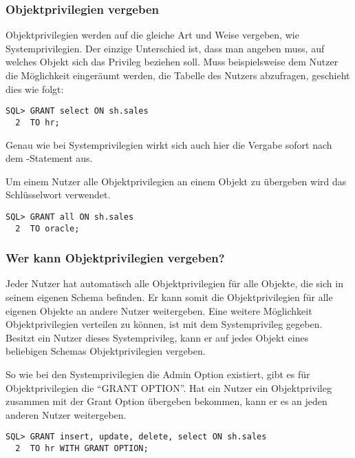         \subsubsection{Objektprivilegien vergeben}
          Objektprivilegien werden auf die gleiche Art und Weise vergeben, wie Systemprivilegien. Der einzige Unterschied ist, dass man angeben muss, auf welches Objekt sich das Privileg beziehen soll. Muss beispielsweise dem Nutzer  die Möglichkeit eingeräumt werden, die Tabelle  des Nutzers  abzufragen, geschieht dies wie folgt:
          \begin{lstlisting}[caption={Zuweisen eines Objekt
          Privilegs},label=admin235,language=oracle_sql] 
SQL> GRANT select ON sh.sales
  2  TO hr;
          \end{lstlisting}
          \begin{merke}
            Genau wie bei Systemprivilegien wirkt sich auch hier die Vergabe sofort nach dem -Statement aus.
          \end{merke}
          Um einem Nutzer alle Objektprivilegien an einem Objekt zu übergeben wird das Schlüs\-selwort  verwendet.
          \begin{lstlisting}[caption={Zuweisen aller
          Objektprivilegien},label=admin236,language=oracle_sql]
SQL> GRANT all ON sh.sales
  2  TO oracle;
          \end{lstlisting}
        \subsubsection{Wer kann Objektprivilegien vergeben?}
          Jeder Nutzer hat automatisch alle Objektprivilegien für alle Objekte, die sich in seinem eigenen Schema befinden. Er kann somit die Objektprivilegien für alle eigenen Objekte an andere Nutzer weitergeben. Eine weitere Möglichkeit Objektprivilegien verteilen zu können, ist mit dem Systemprivileg  gegeben. Besitzt ein Nutzer dieses Systemprivileg, kann er auf jedes Objekt eines beliebigen Schemas Objektprivilegien vergeben.

          So wie bei den Systemprivilegien die Admin Option existiert, gibt es
          für Objektprivilegien die \enquote{GRANT OPTION}. Hat ein Nutzer ein
          Objektprivileg zusammen mit der Grant Option übergeben bekommen,
          kann er es an jeden anderen Nutzer weitergeben.
          \begin{lstlisting}[caption={Zuweisen von Objektprivilegien mit GRANT OPTION},label=admin237,language=oracle_sql]
SQL> GRANT insert, update, delete, select ON sh.sales
  2  TO hr WITH GRANT OPTION;
          \end{lstlisting}
